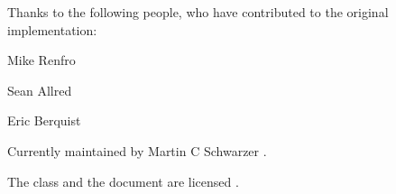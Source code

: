 \documentclass[   %
  final,          %
  a4paper,        %
  columns=3,       %
  margin=1.0cm,   %
]{refcard}
\begin{document}
Thanks to the following people, who have contributed to the original implementation:
\begin{refcardinline}
\item[Mike Renfro] %
  \href{https://tex.stackexchange.com/users/3345}{\faStackExchange}
  \href{https://github.com/mikerenfro}{\faGithub}
\item[Sean Allred]
  \href{https://tex.stackexchange.com/users/17423}{\faStackExchange}
  \href{https://github.com/vermiculus}{\faGithub}
\item[Eric Berquist] 
  \href{https://github.com/berquist}{\faGithub}
\end{refcardinline}

Currently maintained by Martin C Schwarzer \href{https://chemistry.stackexchange.com/users/4945}{\faStackExchange}
  \href{https://github.com/polyluxus}{\faGithub}.

The class and the document are licensed \ccbysa.
\end{document}
